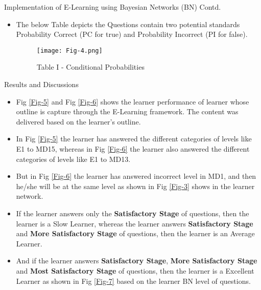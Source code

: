 \documentclass{beamer}
\begin{document}
\begin{frame}
\begin{block}{Implementation of E-Learning using Bayesian Networks (BN) Contd.}
\begin{itemize}
    \item The below Table depicts the Questions contain two potential standards Probability Correct (PC for true) and Probability Incorrect (PI for false).
     \begin{figure}[ht]
            \centering
            \texttt{[image: Fig-4.png]}
            \caption{Table I - Conditional Probabilities}
            \label{Fig-4}
        \end{figure}
\end{itemize}
\end{block}
\end{frame}

\begin{frame}
\begin{block}{Results and Discussions}
\begin{itemize}
    \item Fig \ref{Fig-5} and Fig \ref{Fig-6} shows the learner performance of learner whose outline is capture through the E-Learning framework. The content was delivered based on the learner's outline. 
    \item In Fig \ref{Fig-5} the learner has answered the different categories of levels like E1 to MD15, whereas in Fig \ref{Fig-6} the learner also answered the different categories of levels like E1 to MD13.
    \item But in Fig \ref{Fig-6} the learner has answered incorrect level in MD1, and then he/she will be at the same level as shown in Fig \ref{Fig-3} shows in the learner network.
    \item If the learner answers only the \textbf{Satisfactory Stage} of questions, then the learner is a Slow Learner, whereas the learner answers \textbf{Satisfactory Stage} and \textbf{More Satisfactory Stage} of questions, then the learner is an Average Learner.
    \item And if the learner answers \textbf{Satisfactory Stage}, \textbf{More Satisfactory Stage} and \textbf{Most Satisfactory Stage} of questions, then the learner is a Excellent Learner as shown in Fig \ref{Fig-7} based on the learner BN level of questions. 
    
\end{itemize}
\end{block}
\end{frame}
\end{document}
